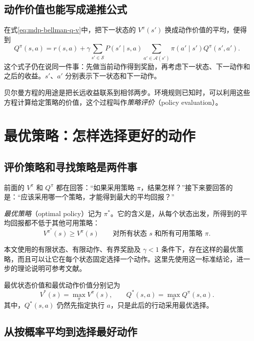 \documentclass[UTF8,12pt,a4paper,fontset=fandol]{ctexart}
\begin{document}
\subsection{动作价值也能写成递推公式}

在式\eqref{eq:mdp-bellman-q-v}中，把下一状态的 $V^\pi(s')$ 换成动作价值的平均，便得到
\begin{equation}
  Q^\pi(s,a)=r(s,a)+\gamma\sum_{s'\in\mathcal S}P(s'\mid s,a)
  \sum_{a'\in\mathcal A(s')}\pi(a'\mid s')Q^\pi(s',a').
  \label{eq:mdp-bellman-q}
\end{equation}
这个式子仍在说同一件事：先做当前动作得到奖励，再考虑下一状态、下一动作和之后的收益。$s'$、$a'$ 分别表示下一状态和下一动作。

贝尔曼方程的用途是把长远收益联系到相邻两步。环境规则已知时，可以利用这些方程计算给定策略的价值，这个过程叫作\emph{策略评价}（policy evaluation）。

\section{最优策略：怎样选择更好的动作}
\label{sec:mdp-optimal}

\subsection{评价策略和寻找策略是两件事}

前面的 $V^\pi$ 和 $Q^\pi$ 都在回答：“如果采用策略 $\pi$，结果怎样？”接下来要回答的是：“应该采用哪一个策略，才能得到最大的平均回报？”

\emph{最优策略}（optimal policy）记为 $\pi^*$。它的含义是，从每个状态出发，所得到的平均回报都不低于其他可用策略：
\begin{equation}
  V^{\pi^*}(s)\geq V^\pi(s)
  \qquad\text{对所有状态 }s\text{ 和所有可用策略 }\pi.
  \label{eq:mdp-optimal-policy}
\end{equation}

本文使用的有限状态、有限动作、有界奖励及 $\gamma<1$ 条件下，存在这样的最优策略，而且可以让它在每个状态固定选择一个动作。这里先使用这一标准结论，进一步的理论说明可参考文献\cite{sutton-barto}。

最优状态价值和最优动作价值分别记为
\begin{equation}
  V^*(s)=\max_\pi V^\pi(s),
  \qquad Q^*(s,a)=\max_\pi Q^\pi(s,a).
  \label{eq:mdp-optimal-value}
\end{equation}
其中，$Q^*(s,a)$ 仍然先指定执行 $a$，只是此后的行动采用最优选择。

\subsection{从按概率平均到选择最好动作}
\end{document}
